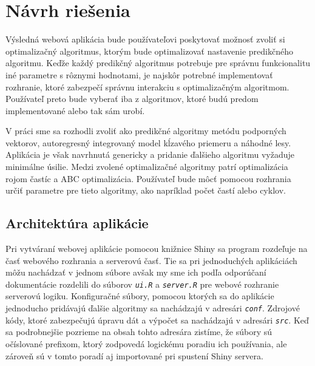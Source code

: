 \documentclass[a4paper,slovak,12pt,appendix]{article}
\begin{document}

\newpage
\section{Návrh riešenia}
\label{solution-design}
Výsledná webová aplikácia bude používateľovi poskytovať možnosť zvoliť si
optimalizačný algoritmus, ktorým bude optimalizovať nastavenie predikčného
algoritmu. Keďže každý predikčný algoritmus potrebuje pre správnu funkcionalitu
iné parametre s rôznymi hodnotami, je najskôr potrebné implementovať rozhranie,
ktoré zabezpečí správnu interakciu s optimalizačným algoritmom. Používateľ
preto bude vyberať iba z algoritmov, ktoré budú predom implementované alebo tak
sám urobí.

V práci sme sa rozhodli zvoliť ako predikčné algoritmy metódu podporných
vektorov, autoregresný integrovaný model kĺzavého priemeru a náhodné lesy.
Aplikácia je však navrhnutá genericky a pridanie ďalšieho algoritmu vyžaduje
minimálne úsilie. Medzi zvolené optimalizačné algoritmy patrí optimalizácia
rojom častíc a ABC optimalizácia. Používateľ bude môcť pomocou rozhrania určiť
parametre pre tieto algoritmy, ako napríklad počet častí alebo cyklov.


\subsection{Architektúra aplikácie}
Pri vytváraní webovej aplikácie pomocou knižnice Shiny sa program rozdeľuje na
časť webového rozhrania a serverovú časť. Tie sa pri jednoduchých aplikáciách
môžu nachádzať v jednom súbore avšak my sme ich podľa odporúčaní dokumentácie
rozdelili do súborov \texttt{\textit{ui.R}} a \texttt{\textit{server.R}} pre webové rozhranie serverovú
logiku. Konfiguračné súbory, pomocou ktorých sa do aplikácie jednoducho
pridávajú ďalšie algoritmy sa nachádzajú v adresári \texttt{\textit{conf}}. Zdrojové kódy,
ktoré zabezpečujú úpravu dát a výpočet sa nachádzajú v adresári \texttt{\textit{src}}.
Keď sa podrobnejšie pozrieme na obsah tohto adresára zistíme, že súbory sú
očíslované prefixom, ktorý zodpovedá logickému poradiu ich používania, ale
zároveň sú v tomto poradí aj importované pri spustení Shiny servera.
\end{document}
